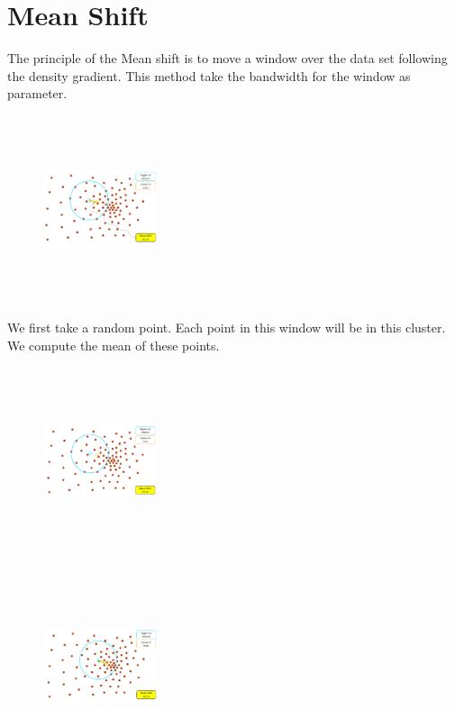 \section{Mean Shift}

The principle of the Mean shift is to move a window over the data set following the density gradient. This method take the bandwidth for the window as parameter.

\begin{figure}[h!]
\includegraphics[width=0.3\textwidth, height=5.5cm]{Image/algo-meanshift1.png}
\end{figure}

We first take a random point. Each point in this window will be in this cluster. We compute the mean of these points.




\begin{figure}[h!]
\includegraphics[width=0.3\textwidth, height=5.5cm]{Image/algo-meanshift2.png}
\end{figure}



\begin{figure}[h!]
\includegraphics[width=0.3\textwidth, height=5.5cm]{Image/algo-meanshift3.png}
\end{figure}


